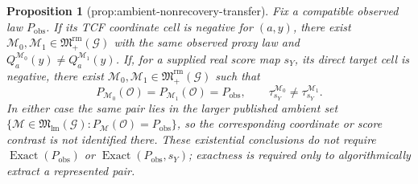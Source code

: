 \documentclass{article}
\newtheorem{proposition}{Proposition}
\begin{document}
\begin{proposition}[prop:ambient-nonrecovery-transfer]\label{prop:ambient-nonrecovery-transfer}
Fix a compatible observed law \(P_{\mathrm{obs}}\). If its TCF coordinate cell is negative for \((a,y)\), there exist \(\mathcal M_0,\mathcal M_1\in\mathfrak M_{+}^{\mathrm{rm}}(\mathcal G)\) with the same observed proxy law and \(Q_a^{\mathcal M_0}(y)\neq Q_a^{\mathcal M_1}(y)\). If, for a supplied real score map \(s_Y\), its direct target cell is negative, there exist \(\mathcal M_0,\mathcal M_1\in\mathfrak M_{+}^{\mathrm{rm}}(\mathcal G)\) such that
\[
P_{\mathcal M_0}(\mathcal O)=P_{\mathcal M_1}(\mathcal O)=P_{\mathrm{obs}},
\qquad
\tau_{s_Y}^{\mathcal M_0}\neq\tau_{s_Y}^{\mathcal M_1}.
\]
In either case the same pair lies in the larger published ambient set \(\{\mathcal M\in\mathfrak M_{\mathrm{lm}}(\mathcal G):P_{\mathcal M}(\mathcal O)=P_{\mathrm{obs}}\}\), so the corresponding coordinate or score contrast is not identified there. These existential conclusions do not require \(\operatorname{Exact}(P_{\mathrm{obs}})\) or \(\operatorname{Exact}(P_{\mathrm{obs}},s_Y)\); exactness is required only to algorithmically extract a represented pair.
\end{proposition}
\end{document}
